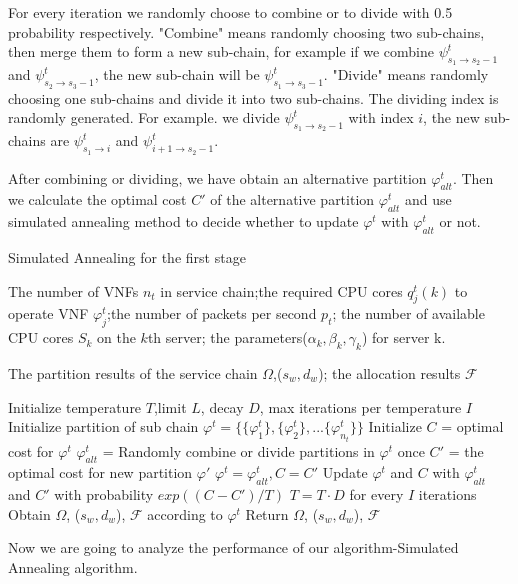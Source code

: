 \documentclass{acmtog}
\begin{document}
For every iteration we randomly choose to combine or to divide with 0.5 probability respectively. "Combine" means randomly choosing two sub-chains, then merge them to form a new sub-chain, for example if we combine $\psi^t_{s_1\to s_2-1}$ and $\psi^t_{s_2\to s_3-1}$, the new sub-chain will be $\psi^t_{s_1\to s_3-1}$. "Divide" means randomly choosing one sub-chains and divide it into two sub-chains. The dividing index is randomly generated. For example. we divide $\psi^t_{s_1\to s_2-1}$ with index $i$, the new sub-chains are $\psi^t_{s_1\to i}$ and  $\psi^t_{i+1\to s_2-1}$.

After combining or dividing, we have obtain an alternative partition  $\varphi^t_{alt}$. Then we calculate the optimal cost $C'$ of the alternative partition $\varphi^t_{alt}$ and use simulated annealing method to decide whether to update $\varphi^t$ with $\varphi^t_{alt}$ or not. 
\begin{algorithm}[H]
\setcounter{algorithm}{0}
\caption{Simulated Annealing for the first stage}
\begin{algorithmic}[1]
\REQUIRE The number of VNFs $n_t$ in service chain;the required CPU cores $q_j^t(k)$ to operate VNF $\varphi_j^t$;the number of packets per second $p_t$; the number of available CPU cores $S_k$ on the $k$th server; the parameters($\alpha_k,\beta_k,\gamma_k$) for server k.

\ENSURE The partition results of the service chain $\Omega$,($s_w,d_w$); the allocation results $\mathcal{F}$

\STATE Initialize temperature $T$,limit $L$, decay $D$, max iterations per temperature $I$
\STATE Initialize partition of sub chain $\varphi^t =
\{ \{\varphi^t_1\},\{\varphi^t_2\},...\{\varphi^t_{n_t}\}\} $
\STATE Initialize $C$ = optimal cost for $\varphi^t$
\STATE $\varphi^t_{alt}$ = Randomly combine or divide partitions in $\varphi^t$ once
\STATE $C'$ = the optimal cost for new partition $\varphi'$
\STATE $\varphi^t = \varphi^t_{alt}, C= C'$
\ELSE
\STATE Update $\varphi^t$ and $C$ with $\varphi^t_{alt}$ and $C'$ with probability $exp((C-C')/T)$
\ENDIF
\ENDFOR
\STATE $T = T \cdot D$ for every $I$ iterations
\ENDWHILE
\STATE Obtain $\Omega$, ($s_w,d_w$), $\mathcal{F}$ according to $\varphi^t$
\STATE Return $\Omega$, ($s_w,d_w$), $\mathcal{F}$
\end{algorithmic}
\end{algorithm}
\vspace{-2ex}
Now we are going to analyze the performance of our algorithm-Simulated Annealing algorithm.
\end{document}
